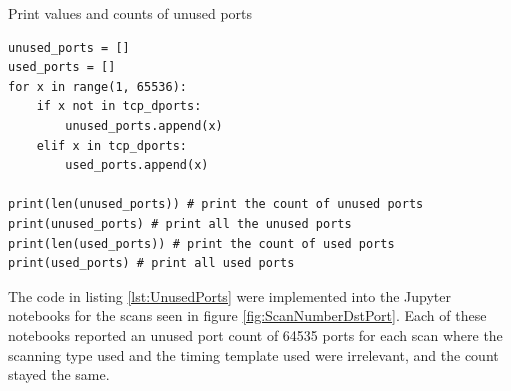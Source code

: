 \begin{listing}[!ht]
\caption{Print values and counts of unused ports}
\label{lst:UnusedPorts}
\begin{verbatim}
unused_ports = []
used_ports = []
for x in range(1, 65536):
    if x not in tcp_dports:
        unused_ports.append(x)
    elif x in tcp_dports:
        used_ports.append(x)

print(len(unused_ports)) # print the count of unused ports
print(unused_ports) # print all the unused ports
print(len(used_ports)) # print the count of used ports
print(used_ports) # print all used ports
\end{verbatim}
\end{listing}

The code in listing \ref{lst:UnusedPorts} were implemented into the Jupyter notebooks for the scans seen in figure \ref{fig:ScanNumberDstPort}. Each of these notebooks reported an unused port count of 64535 ports for each scan where the scanning type used and the timing template used were irrelevant, and the count stayed the same.

\vfill
\clearpage

\newpage
\vfill